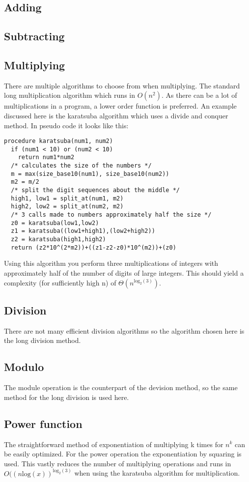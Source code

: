 \documentclass[a4paper,11pt]{article}
\begin{document}
\subsection{Adding}

\subsection{Subtracting}

\subsection{Multiplying}
There are multiple algorithms to choose from when multiplying.
The standard long multiplication algorithm which runs in $O(n^2)$.
As there can be a lot of multiplications in a program, a lower order function is preferred.
An example discussed here is the karatsuba algorithm which uses a divide and conquer method.
In pseudo code it looks like this:
\begin{lstlisting}
procedure karatsuba(num1, num2)
  if (num1 < 10) or (num2 < 10)
    return num1*num2
  /* calculates the size of the numbers */
  m = max(size_base10(num1), size_base10(num2))
  m2 = m/2
  /* split the digit sequences about the middle */
  high1, low1 = split_at(num1, m2)
  high2, low2 = split_at(num2, m2)
  /* 3 calls made to numbers approximately half the size */
  z0 = karatsuba(low1,low2)
  z1 = karatsuba((low1+high1),(low2+high2))
  z2 = karatsuba(high1,high2)
  return (z2*10^(2*m2))+((z1-z2-z0)*10^(m2))+(z0)
\end{lstlisting}
Using this algorithm you perform three multiplications of integers with approximately half of the number of digits of large integers.
This should yield a complexity (for sufficiently high n) of $\Theta (n^{ \text{log} _2(3)})$.

\subsection{Division}
There are not many efficient division algorithms so the algorithm chosen here is the long division method.
\subsection{Modulo}
The module operation is the counterpart of the devision method, so the same method for the long division is used here.

\subsection{Power function}
The straightforward method of exponentiation of multiplying k times for $n^k$ can be easily optimized.
For the power operation the exponentiation by squaring is used.
This vastly reduces the number of multiplying operations and runs in $O((n \text{log} (x))^{ \text{log} _2(3)}$ when using the karatsuba algorithm for multiplication.
\end{document}
